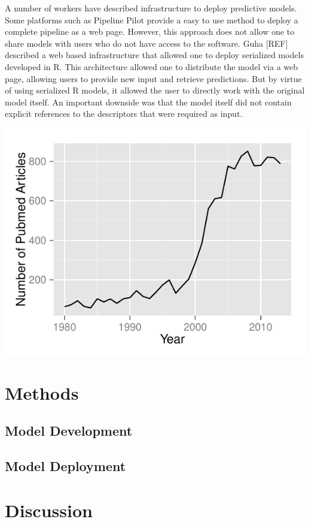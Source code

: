 \documentclass[12pt,letterpaper]{article}
\begin{document}
A number of workers have described infrastructure to deploy predictive
models. Some platforms such as Pipeline Pilot provide a easy to use
method to deploy a complete pipeline as a web page. However, this
approach does not allow one to share models with users who do not have
access to the software. Guha [REF] described a web based
infrastructure that allowed one to deploy serialized models developed
in R. This architecture allowed one to distribute the model via a web
page, allowing users to provide new input and retrieve
predictions. But by virtue of using serialized R models, it allowed
the user to directly work with the original model itself. An important
downside was that the model itself did not contain explicit references
to the descriptors that were required as input. 


{}
{
  \includegraphics{img/count-qsar}
}

\section{Methods}
\label{sec:methods}

\subsection{Model Development}
\label{sec:model-development}


\subsection{Model Deployment}
\label{sec:model-deployment}


\section{Discussion}
\label{sec:discussion}
\end{document}
